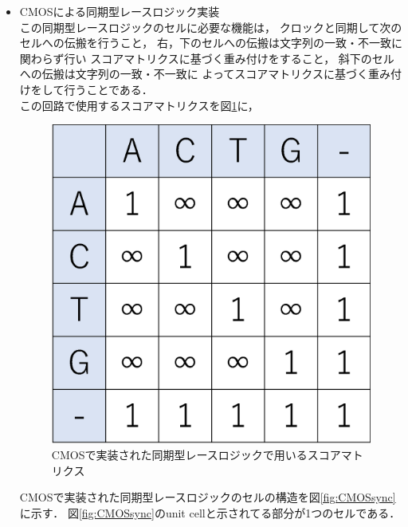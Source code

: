 \begin{itemize}
\item CMOSによる同期型レースロジック実装\\
この同期型レースロジックのセルに必要な機能は，
クロックと同期して次のセルへの伝搬を行うこと，
右，下のセルへの伝搬は文字列の一致・不一致に関わらず行い
スコアマトリクスに基づく重み付けをすること，
斜下のセルへの伝搬は文字列の一致・不一致に
よってスコアマトリクスに基づく重み付けをして行うことである．\\
この回路で使用するスコアマトリクスを図\ref{fig:scoresync}に，
\begin{figure}[t!]
\begin{center}
\includegraphics[keepaspectratio,scale=0.4]{fig/2/CMOSsyncscore.eps}
\caption{CMOSで実装された同期型レースロジックで用いるスコアマトリクス}
\label{fig:scoresync}
\end{center}
\end{figure}
CMOSで実装された同期型レースロジックのセルの構造を図\ref{fig:CMOSsync}に示す．
図\ref{fig:CMOSsync}のunit cellと示されてる部分が1つのセルである．\\
\begin{figure}[t!]
\begin{center}

\end{center}
\end{figure}
\end{itemize}

